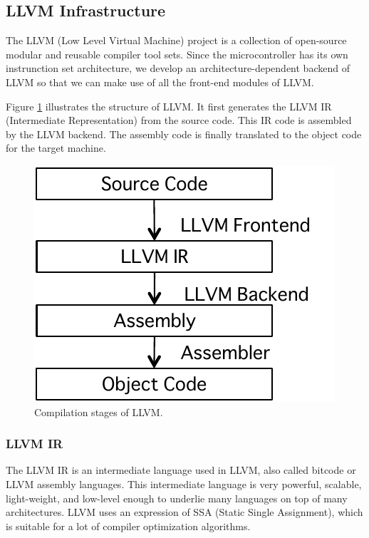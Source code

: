 \subsection{LLVM Infrastructure}

The LLVM (Low Level Virtual Machine) project is a collection of
open-source modular and reusable compiler tool sets.
Since the microcontroller has its own instrunction set architecture, we
develop an architecture-dependent backend of LLVM so that we can make
use of all the front-end modules of LLVM.

Figure \ref{fig:llvm} illustrates the structure of LLVM.
It first generates the LLVM IR (Intermediate Representation) from the
source code. 
This IR code is assembled by the LLVM backend.
The assembly code is finally translated to the object code for the
target machine.

\begin{figure}
\begin{center}
\includegraphics[scale = 0.5]{./img/llvmflow.pdf}
\end{center}
\caption{Compilation stages of LLVM.}
\label{fig:llvm}
\end{figure}

\subsubsection{LLVM IR}

The LLVM IR is an intermediate language used in LLVM, also called bitcode or
LLVM assembly languages.
This intermediate language is very powerful, scalable, light-weight, and
low-level enough to underlie many languages on top of many
architectures.
LLVM uses an expression of SSA (Static Single Assignment), which is
suitable for a lot of compiler optimization algorithms.

